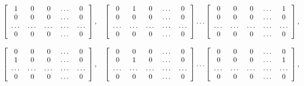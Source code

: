 \begin{equation*}
\left[ \begin{array}{c c c c c} 1 & 0 & 0 & \dots & 0 \\ 0 & 0 & 0 & \dots & 0 \\ \dots & \dots & \dots & \dots & \dots \\ 0 & 0 & 0 & \dots & 0 \end{array} \right], \quad \left[ \begin{array}{c c c c c} 0 & 1 & 0 & \dots & 0 \\ 0 & 0 & 0 & \dots & 0 \\ \dots & \dots & \dots & \dots & \dots \\ 0 & 0 & 0 & \dots & 0 \end{array} \right] \dots \left[ \begin{array}{c c c c c} 0 & 0 & 0 & \dots & 1 \\ 0 & 0 & 0 & \dots & 0 \\ \dots & \dots & \dots & \dots & \dots \\ 0 & 0 & 0 & \dots & 0 \end{array} \right],
\end{equation*}

\begin{equation*}
\left[ \begin{array}{c c c c c} 0 & 0 & 0 & \dots & 0 \\ 1 & 0 & 0 & \dots & 0 \\ \dots & \dots & \dots & \dots & \dots \\ 0 & 0 & 0 & \dots & 0 \end{array} \right], \quad \left[ \begin{array}{c c c c c} 0 & 0 & 0 & \dots & 0 \\ 0 & 1 & 0 & \dots & 0 \\ \dots & \dots & \dots & \dots & \dots \\ 0 & 0 & 0 & \dots & 0 \end{array} \right] \dots \left[ \begin{array}{c c c c c} 0 & 0 & 0 & \dots & 0 \\ 0 & 0 & 0 & \dots & 1 \\ \dots & \dots & \dots & \dots & \dots \\ 0 & 0 & 0 & \dots & 0 \end{array} \right],
\end{equation*}

